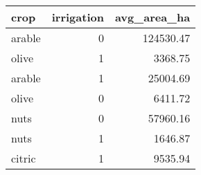 \begin{table}[ht]
\centering
\begin{tabular}{lrr}
  \hline
crop & irrigation & avg\_area\_ha \\ 
  \hline
arable &   0 & 124530.47 \\ 
  olive &   1 & 3368.75 \\ 
  arable &   1 & 25004.69 \\ 
  olive &   0 & 6411.72 \\ 
  nuts &   0 & 57960.16 \\ 
  nuts &   1 & 1646.87 \\ 
  citric &   1 & 9535.94 \\ 
   \hline
\end{tabular}
\end{table}
